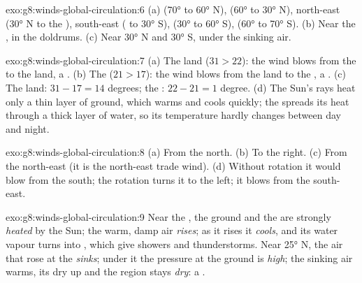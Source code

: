 \begin{solution}{exo:g8:winds-global-circulation:6}
(a)  (\ang{70} to \ang{60} N),  (\ang{60} to
\ang{30} N), north-east  (\ang{30} N to the ),
south-east  ( to \ang{30} S),  (\ang{30} to
\ang{60} S),  (\ang{60} to \ang{70} S). (b) Near the
, in the doldrums. (c) Near \ang{30} N and \ang{30} S, under the
sinking air.
\end{solution}

\begin{solution}{exo:g8:winds-global-circulation:7}
(a) The land ($31 > 22$): the wind blows from the  to the land, a . (b) The  ($21 > 17$): the wind blows from the land to the
, a . (c) The land: $31 - 17 = 14$ degrees; the : $22 -
21 = 1$ degree. (d) The Sun's rays heat only a thin layer of ground,
which warms and cools quickly; the  spreads its heat through a thick
layer of water, so its temperature hardly changes between day and night.
\end{solution}

\begin{solution}{exo:g8:winds-global-circulation:8}
(a) From the north. (b) To the right. (c) From the north-east (it is the
north-east trade wind). (d) Without rotation it would blow from the
south; the rotation turns it to the left; it blows from the south-east.
\end{solution}

\begin{solution}{exo:g8:winds-global-circulation:9}
Near the , the ground and the  are strongly \emph{heated} by
the Sun; the warm, damp air \emph{rises}; as it rises it \emph{cools},
and its water vapour turns into \emph{}, which give showers and
thunderstorms. Near \ang{25} N, the air that rose at the 
\emph{sinks}; under it the pressure at the ground is \emph{high}; the
sinking air warms, its  dry up and the region stays \emph{dry}: a
.
\end{solution}

